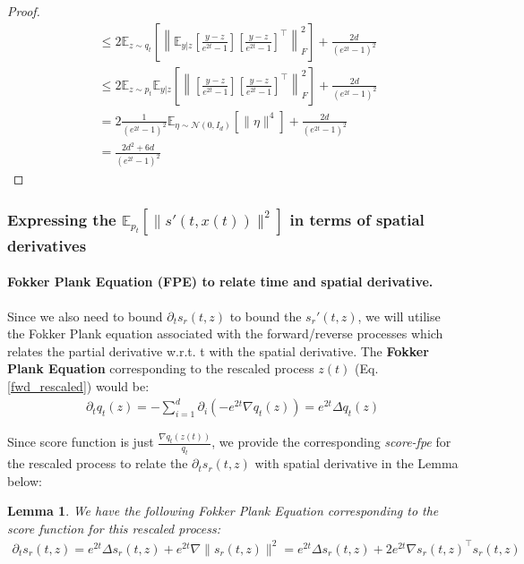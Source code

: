 \documentclass{article}
\newtheorem{lemma}{Lemma}[section]
\begin{document}
\begin{proof}
\begin{align*}
        &\leq 2\mathbb{E}_{z\sim q_t}\left[\left\|\mathbb{E}_{y|z}\left[\frac{y-z}{e^{2t}-1}\right]\left[\frac{y-z}{e^{2t}-1}\right]^{\top}\right\|^2_F\right] + \frac{2d}{(e^{2t}-1)^2}\\
        & \leq 2\mathbb{E}_{z\sim p_t}\mathbb{E}_{y|z}\left[\left\|\left[\frac{y-z}{e^{2t}-1}\right]\left[\frac{y-z}{e^{2t}-1}\right]^{\top}\right\|^2_F\right] + \frac{2d}{(e^{2t}-1)^2}\\
        &=2\frac{1}{(e^{2t}-1)^2}\mathbb{E}_{\eta \sim \mathcal{N}(0,I_d)}\left[\|\eta\|^4\right] + \frac{2d}{(e^{2t}-1)^2} \\
        &= \frac{2d^2+6d}{(e^{2t}-1)^2}
    \end{align*}
\end{proof}

\subsubsection{Expressing the $\mathbb{E}_{p_t}\left[\|s'(t,x(t))\|^2\right]$ in terms of spatial derivatives}

\paragraph{Fokker Plank Equation (FPE) to relate time and spatial derivative.} Since we also need to bound $\partial_t s_r(t,z)$ to bound the $s_r'(t,z)$, we will utilise the Fokker Plank equation associated with the forward/reverse processes which relates the partial derivative w.r.t. t with the spatial derivative. The \textbf{Fokker Plank Equation} corresponding to the rescaled process $z(t)$ (Eq.\ref{fwd_rescaled}) would be:
\begin{align}
\label{fpe_rescaled}
    \partial_tq_t(z) = -\sum_{i=1}^d \partial_i \left(-e^{2t}\nabla q_t(z)\right) = e^{2t}\Delta q_t(z)
\end{align}

\noindent
Since score function is just $\frac{\nabla q_t(z(t))}{q_t}$, we provide the corresponding \textit{score-fpe} for the rescaled process to relate the $\partial_t s_r(t,z)$ with spatial derivative in the Lemma below:

\begin{lemma}
\label{score_fpe}
 We have the following Fokker Plank Equation corresponding to the score function for this rescaled process:
    \begin{align}
    \label{score_fpe_eq}
    \partial_t s_r(t,z) = e^{2t} \Delta s_r(t,z) + e^{2t}\nabla \|s_r(t,z)\|^2 = e^{2t} \Delta s_r(t,z) + 2e^{2t}\nabla s_r(t,z)^\top s_r(t,z)
\end{align}
\end{lemma}
\end{document}
